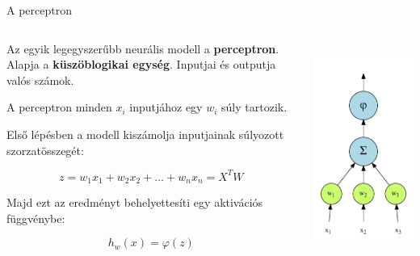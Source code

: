 \documentclass[english, aspectratio=169]{beamer}
\begin{document}
\begin{frame}{A perceptron}
\begin{columns}
\begin{column}{.5\textwidth}
Az egyik legegyszerűbb neurális modell a \textbf{perceptron}. Alapja a \textbf{küszöblogikai egység}. Inputjai és outputja valós számok.\par\smallskip
A perceptron minden $x_i$ inputjához egy $w_i$ súly tartozik.\par\smallskip
Első lépésben a modell kiszámolja inputjainak súlyozott szorzatösszegét:
\begin{block}{}
\vspace{-.6cm}
\[
z = w_1x_1 + w_2x_2 + \ldots + w_nx_n = X^TW
\]
\end{block}
Majd ezt az eredményt behelyettesíti egy aktivációs függvénybe:
\begin{block}{}
\vspace{-.2cm}
\[
h_w\left( x \right) = \varphi\left( z \right)
\]
\end{block}
\end{column}
\begin{column}{.5\textwidth}
\begin{center}
\includegraphics[width=7cm, height=7cm, keepaspectratio]{graphs/neural_6.png}
\end{center}
\end{column}
\end{columns}
\end{frame}
\end{document}
